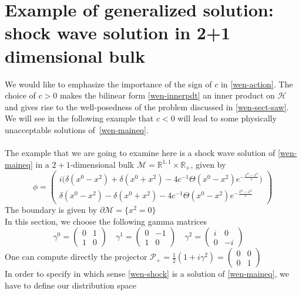 \section{Example of generalized solution: shock wave solution in 2+1 dimensional bulk}\label{appendix-wen-shockwave}
We would like to emphasize the importance of the sign of $c$ in \cref{wen-action}. 
The choice of $c>0$ makes the bilinear form \cref{wen-innerpdt} an inner product on $\mathcal{H}$ and gives rise to the well-posedness of the problem discussed in \cref{wen-sect-saw}.
We will see in the following example that $c < 0 $ will lead to some physically unacceptable solutions of~\cref{wen-maineq}. \\\\
The example that we are going to examine here is a shock wave solution of \cref{wen-maineq} in a $2+1$-dimensional bulk $\mathcal{M} = \mathbb{R}^{1,1}\times\mathbb{R}_+$, given by
\begin{equation}\label{wen-shock}
\phi = \begin{pmatrix}
i \big(\delta(x^0 - x^2) + \delta(x^0 + x^2) - 4c^{-1}\Theta(x^0-x^2)e^{- \frac{x^0-x^2}{c}} \big) \\
\delta({x^0 - x^2}) - \delta(x^0 + x^2) - 4c^{-1}\Theta(x^0-x^2)e^{- \frac{x^0-x^2}{c}} \end{pmatrix}
\end{equation}
The boundary is given by $\partial\mathcal{M} = \{x^2 = 0\}$ \\
In this section, we choose the following gamma matrices
\begin{equation*}
\gamma^0 = \begin{pmatrix} 0 & 1 \\ 1 &0 \end{pmatrix} \quad
\gamma^1 = \begin{pmatrix} 0 & -1 \\ 1 &0 \end{pmatrix} \quad
\gamma^2 = \begin{pmatrix} i & 0 \\ 0 &-i \end{pmatrix} \quad
\end{equation*}
One can compute directly the projector $\mathcal{P}_+ = \frac{1}{2}(1+i\gamma^2) 
= \begin{pmatrix}0 & 0 \\ 0 & 1 \end{pmatrix}$ \\
In order to specify in which sense \cref{wen-shock} is a solution of \cref{wen-maineq}, we have to define our distribution space
